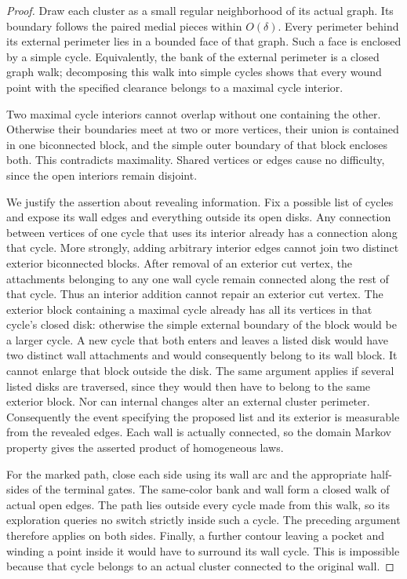 \begin{proof}
Draw each cluster as a small regular neighborhood of its actual graph.
Its boundary follows the paired medial pieces within $O(\delta)$.
Every perimeter behind its external perimeter lies in a bounded face
of that graph.  Such a face is enclosed by a simple cycle.  Equivalently,
the bank of the external perimeter is a closed graph walk; decomposing
this walk into simple cycles shows that every wound point with the
specified clearance belongs to a maximal cycle interior.

Two maximal cycle interiors cannot overlap without one containing the
other.  Otherwise their boundaries meet at two or more vertices, their
union is contained in one biconnected block, and the simple outer boundary
of that block encloses both.  This contradicts maximality.  Shared
vertices or edges cause no difficulty, since the open interiors remain
disjoint.

We justify the assertion about revealing information.  Fix a possible
list of cycles and expose its wall edges and everything outside its
open disks.  Any connection between vertices of one cycle that uses
its interior already has a connection along that cycle.  More strongly,
adding arbitrary interior edges cannot join two distinct exterior
biconnected blocks.  After removal of an exterior cut vertex, the
attachments belonging to any one wall cycle remain connected along
the rest of that cycle.  Thus an interior addition cannot repair an
exterior cut vertex.  The exterior block containing a maximal cycle
already has all its vertices in that cycle's closed disk: otherwise
the simple external boundary of the block would be a larger cycle.
A new cycle that both enters and leaves a listed disk would have two
distinct wall attachments and would consequently belong to its wall
block.  It cannot enlarge that block outside the disk.  The same
argument applies if several listed disks are traversed, since they
would then have to belong to the same exterior block.  Nor can internal
changes alter an external cluster perimeter.  Consequently the event
specifying the proposed list and its exterior is measurable from the
revealed edges.  Each wall is actually connected, so the domain Markov
property gives the asserted product of homogeneous laws.

For the marked path, close each side using its wall arc and the
appropriate half-sides of the terminal gates.  The same-color bank and
wall form a closed walk of actual open edges.  The path lies outside
every cycle made from this walk, so its exploration queries no switch
strictly inside such a cycle.  The preceding argument therefore applies
on both sides.  Finally, a further contour leaving a pocket and winding
a point inside it would have to surround its wall cycle.  This is
impossible because that cycle belongs to an actual cluster connected
to the original wall.
\end{proof}

